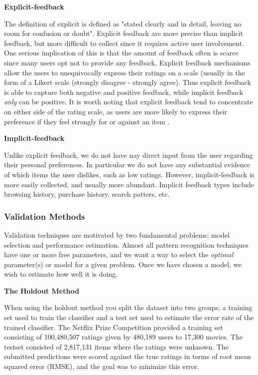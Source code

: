 \textbf{Explicit-feedback}

The definition of explicit is defined as "stated clearly and in detail, leaving no room for confusion or doubt". Explicit feedback are more precise than implicit feedback, but more difficult to collect since it requires active user involvement. One serious implication of this is that the amount of feedback often is scarce since many users opt not to provide any feedback. Explicit feedback mechanisms allow the users to unequivocally express their ratings on a scale (usually in the form of a Likert scale (strongly disagree - strongly agree). Thus explicit feedback is able to capture both negative and positive feedback, while implicit feedback \emph{only} can be positive. It is worth noting that explicit feedback tend to concentrate on either side of the rating scale, as users are more likely to express their preference if they feel strongly for or against an item \cite{Jawaheer2010}.

\textbf{Implicit-feedback}


Unlike explicit feedback, we do not have nay direct input from the user regarding their personal preferences. In particular we do not have any substantial evidence of which items the user dislikes, such as low ratings. However, implicit-feedback is more easily collected, and usually more abundant. Implicit feedback types include browsing history, purchase history, search patters, etc.


\subsubsection{Validation Methods}

Validation techniques are motivated by two fundamental problems; model selection and performance estimation. Almost all pattern recognition techniques have one or more free parameters, and we want a way to select the \emph{optimal} parameter(s) or model for a given problem. Once we have chosen a model, we wish to estimate how well it is doing.

\textbf{The Holdout Method}

When using the holdout method you split the dataset into two groups; a training set used to train the classifier and a test set used to estimate the error rate of the trained classifier. The Netflix Prize Competition \cite{Netflix} provided a training set consisting of 100,480,507 ratings given by 480,189 users to 17,300 movies. The testset consisted of 2,817,131 items where the ratings were unknown. The submitted predictions were scored against the true ratings in terms of root mean squared error (RMSE), and the goal was to minimize this error.

